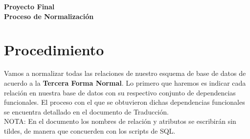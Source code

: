 \documentclass[11pt]{article}
\begin{document}
\begin{center}
	\LARGE{\textbf{Proyecto Final\\Proceso de Normalización}}
\end{center}

\section*{Procedimiento}
Vamos a normalizar todas las relaciones de nuestro esquema de base de datos de acuerdo a la \textbf{Tercera Forma Normal}. Lo primero que haremos es indicar cada relación en nuestra base de datos con su respectivo conjunto de dependencias funcionales. El proceso con el que se obtuvieron dichas dependencias funcionales se encuentra detallado en el documento de Traducción.\\
NOTA: En el documento los nombres de relación y atributos se escribirán sin tildes, de manera que concuerden con los scripts de SQL.
\end{document}
